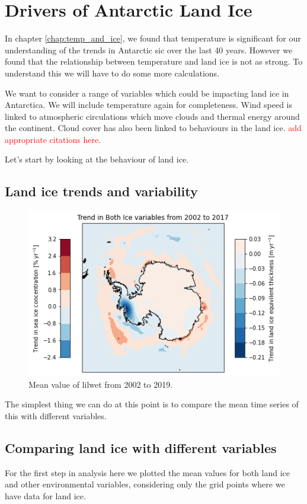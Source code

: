 \documentclass[../main.tex]{subfiles}
\begin{document}
\chapter{Drivers of Antarctic Land Ice}
\label{chap:land_ice}
In chapter \ref{chap:temp_and_ice}, we found that temperature is significant for our understanding of the trends in Antarctic \gls{sic} over the last 40 years. However we found that the relationship between temperature and land ice is not as strong. To understand this we will have to do some more calculations.

We want to consider a range of variables which could be impacting land ice in Antarctica. We will include temperature again for completeness. Wind speed is linked to atmospheric circulations which move clouds and thermal energy around the continent. Cloud cover has also been linked to behaviours in the land ice. \textcolor{red}{add appropriate citations here}. 

Let's start by looking at the behaviour of land ice.

\section{Land ice trends and variability}
 \begin{figure}[H]
     \centering
     \includegraphics{images/2021w4/trends_lic2/lres/combined_ice}
     \caption{Mean value of \gls{lilwet} from 2002 to 2019.}
     \label{fig:lilwet_mean}
 \end{figure}

The simplest thing we can do at this point is to compare the mean time series of this with different variables.

\section{Comparing land ice with different variables}
For the first step in analysis here we plotted the mean values for both land ice and other environmental variables, considering only the grid points where we have data for land ice.
\end{document}
